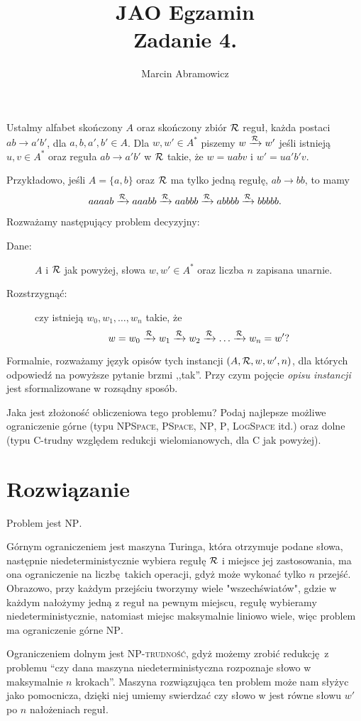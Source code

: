 \documentclass[a4paper]{article}
\title{JAO Egzamin\\ Zadanie 4.}
\author{Marcin Abramowicz}
\newcommand{\set}[1]{\{#1\}}%
\newcommand{\tran}[1]{\xrightarrow{#1}}%
\begin{document}
\maketitle

\newcommand{\tor}{\tran{\cal R}}
Ustalmy alfabet skończony $A$ oraz skończony  zbiór $\cal R$ reguł, każda postaci
$ab\to a'b'$, dla $a,b,a',b'\in A$.
Dla $w,w'\in A^*$ piszemy $w\tor w'$ jeśli istnieją $u,v\in A^*$
oraz reguła $ab\to a'b'$ w $\cal R$ takie, że $w=uabv$ i $w'=ua'b'v$.

Przykładowo, jeśli $A=\set{a,b}$ oraz $\cal R$ ma tylko jedną regułę, $ab\to bb$, to mamy $$aaaab\tor aaabb\tor aabbb\tor abbbb\tor bbbbb.$$

Rozważamy następujący problem decyzyjny:
\begin{description}
\item [Dane:]$A$ i $\cal R$ jak powyżej, słowa $w,w'\in A^*$ oraz liczba $n$ zapisana unarnie.
\item [Rozstrzygnąć:]czy istnieją $w_0,w_1,\ldots,w_n$ takie, że
$$w=w_0\tor w_1\tor w_2\tor \ldots \tor w_n=w'?$$ 
\end{description}
Formalnie, rozważamy język opisów tych instancji $(A,{\cal R},w,w',n)$, dla których odpowiedź na powyższe pytanie brzmi ,,tak''. Przy czym pojęcie \emph{opisu instancji} jest sformalizowane w rozsądny sposób.

Jaka jest złożoność obliczeniowa tego problemu? Podaj najlepsze możliwe ograniczenie górne (typu \textsc{NPSpace}, \textsc{PSpace}, \textsc{NP}, \textsc{P}, \textsc{LogSpace} itd.) oraz dolne (typu \textsc{C}-trudny względem redukcji wielomianowych, dla \textsc{C} jak powyżej).


\section*{Rozwiązanie}
Problem jest \textsc{NP}. 

Górnym ograniczeniem jest maszyna Turinga, która otrzymuje podane słowa, następnie niedeterministycznie wybiera regułę $\cal R$ i miejsce jej zastosowania, ma ona ograniczenie na liczbę takich operacji, gdyż może wykonać tylko $n$ przejść. Obrazowo, przy każdym przejściu tworzymy wiele "wszechświatów", gdzie w każdym nałożymy jedną z reguł na pewnym miejscu, regułę wybieramy niedeterministycznie, natomiast miejsc maksymalnie liniowo wiele, więc problem ma ograniczenie górne \textsc{NP}.

Ograniczeniem dolnym jest \textsc{NP-trudność}, gdyż możemy zrobić redukcję z problemu ``czy dana maszyna niedeterministyczna rozpoznaje słowo w maksymalnie $n$ krokach''. Maszyna rozwiązująca ten problem może nam słyżyc jako pomocnicza, dzięki niej umiemy swierdzać czy słowo w jest równe słowu $w'$ po $n$ nałożeniach reguł.
\end{document}
